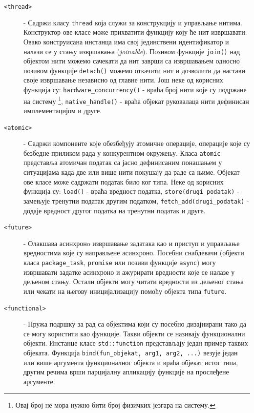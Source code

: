 \documentclass[12pt,oneside]{memoir}
\begin{document}
\begin{description}
	\item[\texttt{<thread>}] - Садржи класу \texttt{thread} која служи за конструкцију и управљање нитима. Конструктор ове класе може прихватити функцију коју ће нит извршавати. Овако конструисана инстанца има свој јединствени идентификатор и налази се у стању извршавања (\textit{joinable}). Позивом функције \texttt{join()} над објектом нити можемо сачекати да нит заврши са извршавањем односно позивом функције \texttt{detach()} можемо откачити нит и дозволити да настави своје извршавање независно од главне нити. Још неке од корисних функција су: \texttt{hardware\_concurrency()} - враћа број нити које су подржане на систему \footnote{Овај број не мора нужно бити број физичких језгара на систему.}, \texttt{native\_handle()} - враћа објекат руковалаца нити дефинисан имплементацијом и друге.
	\item[\texttt{<atomic>}] - Садржи компоненте које обезбеђују атомичне операције, операције које су безбедне приликом рада у конкурентном окружењу. Класа \texttt{atomic} представља атомичан податак са јасно дефинисаним понашањем у ситуацијама када две или више нити покушају да раде са њиме. Објекат ове класе може садржати податак било ког типа. Неке од корисних функција су: \texttt{load()} - враћа вредност податка, \texttt{store(drugi\_podatak)} - замењује тренутни податак другим податком, \texttt{fetch\_add(drugi\_podatak)} - додаје вредност другог податка на тренутни податак и друге.
	\item[\texttt{<future>}] - Олакшава асинхронo извршавање задатака као и приступ и управљање вредностима које су направљене асинхроно. Посебни снабдевачи (објекти класа \texttt{package\_task}, \texttt{promise} или позиви функције \texttt{async}) могу извршавати задатке асинхроно и ажурирати вредности које се налазе у дељеном стању. Остали објекти могу читати вредности из дељеног стања или чекати на његову иницијализацију помоћу објекта типа \texttt{future}.    
	\item[\texttt{<functional>}] - Пружа подршку за рад са објектима који су посебно дизајнирани тако да се могу користити као функције. Такви објекти се називају функционални објекти. Инстанце класе \texttt{std::function} представљају један пример таквих објеката. Функција \texttt{bind(fun\_objekat, arg1, arg2, ...)}  везује један или више аргумента функционалног објекта и враћа објекат истог типа, другим речима врши парцијалну апликацију функције на прослеђене аргументе.   
\end{description}
\end{document}
